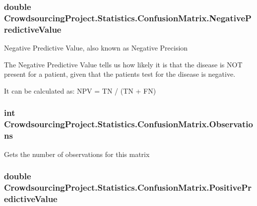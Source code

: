 \subsubsection[{Negative\+Predictive\+Value}]{\setlength{\rightskip}{0pt plus 5cm}double Crowdsourcing\+Project.\+Statistics.\+Confusion\+Matrix.\+Negative\+Predictive\+Value\hspace{0.3cm}{\ttfamily [get]}}\label{class_crowdsourcing_project_1_1_statistics_1_1_confusion_matrix_a53e260e21777e62a8880d57ae1a2d6b4}


Negative Predictive Value, also known as Negative Precision 

The Negative Predictive Value tells us how likely it is that the disease is N\+O\+T present for a patient, given that the patient\textquotesingle{}s test for the disease is negative.

It can be calculated as\+: N\+P\+V = T\+N / (T\+N + F\+N) \hypertarget{class_crowdsourcing_project_1_1_statistics_1_1_confusion_matrix_a9f421cb6ea3fab10b50af5c05e663146}{}
\subsubsection[{Observations}]{\setlength{\rightskip}{0pt plus 5cm}int Crowdsourcing\+Project.\+Statistics.\+Confusion\+Matrix.\+Observations\hspace{0.3cm}{\ttfamily [get]}}\label{class_crowdsourcing_project_1_1_statistics_1_1_confusion_matrix_a9f421cb6ea3fab10b50af5c05e663146}


Gets the number of observations for this matrix 

\hypertarget{class_crowdsourcing_project_1_1_statistics_1_1_confusion_matrix_afb699f40850b19bba5c430eab686eff2}{}
\subsubsection[{Positive\+Predictive\+Value}]{\setlength{\rightskip}{0pt plus 5cm}double Crowdsourcing\+Project.\+Statistics.\+Confusion\+Matrix.\+Positive\+Predictive\+Value\hspace{0.3cm}{\ttfamily [get]}}\label{class_crowdsourcing_project_1_1_statistics_1_1_confusion_matrix_afb699f40850b19bba5c430eab686eff2}


